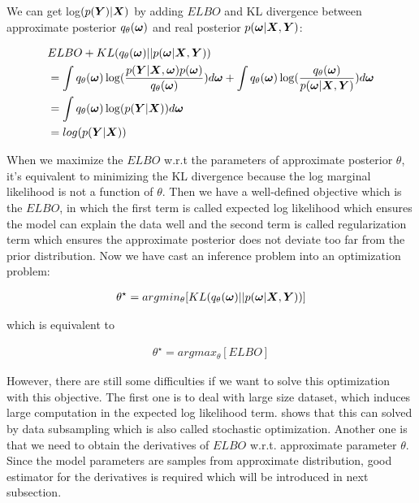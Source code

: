 We can get log$(p(\boldsymbol Y) | \boldsymbol X)$ by adding $ELBO$ and KL divergence between approximate posterior $q_{\theta}(\boldsymbol \omega)$ and real posterior $p(\boldsymbol \omega | \boldsymbol X, \boldsymbol Y)$:

\begin{equation}\label{2.7}	
\begin{aligned}
 & ELBO + KL(q_{\theta}(\boldsymbol{\omega}) || p(\boldsymbol{\omega}|\boldsymbol{X}, \boldsymbol{Y})) \\ 
 & = \int q_{\theta}(\boldsymbol{\omega}) \log( \frac{p(\boldsymbol{Y}| \boldsymbol{X}, \boldsymbol{\omega}) p(\boldsymbol{\omega})}{q_{\theta}(\boldsymbol{\omega})}) d\boldsymbol{\omega} + \int q_{\theta}(\boldsymbol{\omega}) \log(\frac{q_{\theta}(\boldsymbol{\omega})}{p(\boldsymbol{\omega}|\boldsymbol{X}, \boldsymbol{Y})}) d\boldsymbol{\omega} \\
 & = \int q_{\theta}(\boldsymbol{\omega}) \log(p(\boldsymbol{Y} | \boldsymbol{X}))d\boldsymbol{\omega}\\
 & = log(p(\boldsymbol{Y}|\boldsymbol{X})) 
\end{aligned}
\end{equation}

When we maximize the $ELBO$ w.r.t the parameters of approximate posterior $\theta$, it's equivalent to minimizing the KL divergence because the log marginal likelihood is not a function of $\theta$. Then we have a well-defined objective which is the $ELBO$, in which the first term is called expected log likelihood which ensures the model can explain the data well and the second term is called regularization term which ensures the approximate posterior does not deviate too far from the prior distribution.
Now we have cast an inference problem into an optimization problem:

\begin{equation}\label{2.8}	
\begin{aligned}
\theta^{\star} = argmin_{\theta} [KL(q_{\theta}(\boldsymbol \omega)||p(\boldsymbol \omega | \boldsymbol X, \boldsymbol Y))]
\end{aligned}
\end{equation}

which is equivalent to 

\begin{equation}\label{2.9}	
\begin{aligned}
\theta^{\star} = argmax_{\theta} [ELBO]
\end{aligned}
\end{equation}

However, there are still some difficulties if we want to solve this optimization with this objective. The first one is to deal with large size dataset, which induces large computation in the expected log likelihood term. \cite{graves2011practical} shows that this can solved by data subsampling which is also called stochastic optimization. Another one is that we need to obtain the derivatives of $ELBO$ w.r.t. approximate parameter $\theta$. Since the model parameters are samples from approximate distribution, good estimator for the derivatives is required which will be introduced in next subsection. 


